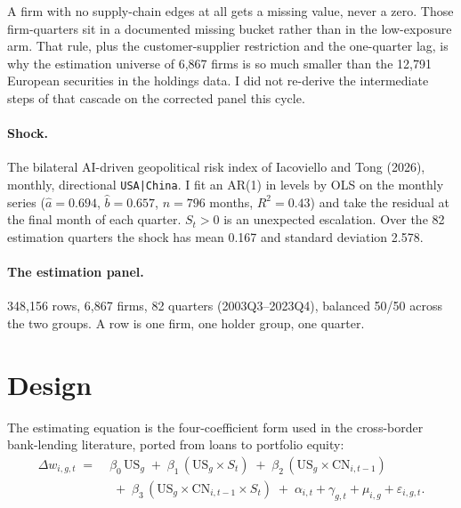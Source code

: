 \documentclass[11pt]{article}
\begin{document}
A firm with no supply-chain edges at all gets a missing value, never a zero.
Those firm-quarters sit in a documented missing bucket rather than in the
low-exposure arm. That rule, plus the customer-supplier restriction and the
one-quarter lag, is why the estimation universe of 6,867 firms is so much
smaller than the 12,791 European securities in the holdings data. I did not
re-derive the intermediate steps of that cascade on the corrected panel this
cycle.

\paragraph{Shock.} The bilateral AI-driven geopolitical risk index of
Iacoviello and Tong (2026), monthly, directional \texttt{USA|China}. I fit an
AR(1) in levels by OLS on the monthly series ($\hat{a} = 0.694$,
$\hat{b} = 0.657$, $n = 796$ months, $R^2 = 0.43$) and take the residual at the
final month of each quarter. $S_t > 0$ is an unexpected escalation. Over the 82
estimation quarters the shock has mean 0.167 and standard deviation 2.578.

\paragraph{The estimation panel.} 348,156 rows, 6,867 firms, 82 quarters
(2003Q3--2023Q4), balanced 50/50 across the two groups. A row is one firm, one
holder group, one quarter.

\section{Design}

The estimating equation is the four-coefficient form used in the cross-border
bank-lending literature, ported from loans to portfolio equity:
\begin{equation*}
\begin{split}
\Delta w_{i,g,t} \;=\;& \beta_0 \, \mathrm{US}_g
\;+\; \beta_1 \, (\mathrm{US}_g \times S_t)
\;+\; \beta_2 \, (\mathrm{US}_g \times \mathrm{CN}_{i,t-1}) \\[2pt]
&\;+\; \beta_3 \, (\mathrm{US}_g \times \mathrm{CN}_{i,t-1} \times S_t)
\;+\; \alpha_{i,t} + \gamma_{g,t} + \mu_{i,g} + \varepsilon_{i,g,t}.
\end{split}
\end{equation*}
\end{document}
